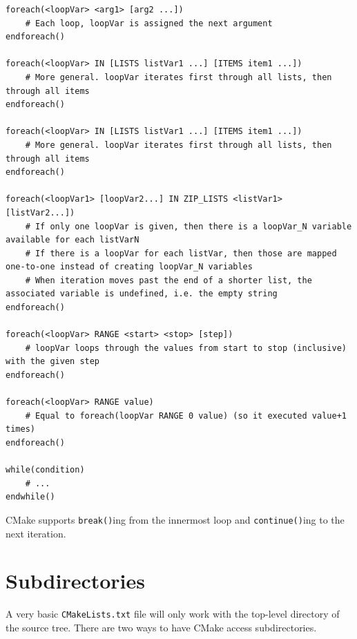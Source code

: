 \documentclass[table, xcdraw]{article}%
\begin{document}
\begin{verbatim}
foreach(<loopVar> <arg1> [arg2 ...])
    # Each loop, loopVar is assigned the next argument
endforeach()

foreach(<loopVar> IN [LISTS listVar1 ...] [ITEMS item1 ...])
    # More general. loopVar iterates first through all lists, then through all items
endforeach()

foreach(<loopVar> IN [LISTS listVar1 ...] [ITEMS item1 ...])
    # More general. loopVar iterates first through all lists, then through all items
endforeach()

foreach(<loopVar1> [loopVar2...] IN ZIP_LISTS <listVar1> [listVar2...])
    # If only one loopVar is given, then there is a loopVar_N variable available for each listVarN
    # If there is a loopVar for each listVar, then those are mapped one-to-one instead of creating loopVar_N variables
    # When iteration moves past the end of a shorter list, the associated variable is undefined, i.e. the empty string
endforeach()

foreach(<loopVar> RANGE <start> <stop> [step])
    # loopVar loops through the values from start to stop (inclusive) with the given step
endforeach()

foreach(<loopVar> RANGE value)
    # Equal to foreach(loopVar RANGE 0 value) (so it executed value+1 times)
endforeach()

while(condition)
    # ...
endwhile()
\end{verbatim}

CMake supports \texttt{break()}ing from the innermost loop and \texttt{continue()}ing to the next iteration.

\section{Subdirectories} \label{subdirectories}

A very basic \texttt{CMakeLists.txt} file will only work with the top-level directory of the source tree. There are two ways to have CMake access subdirectories.
\end{document}
